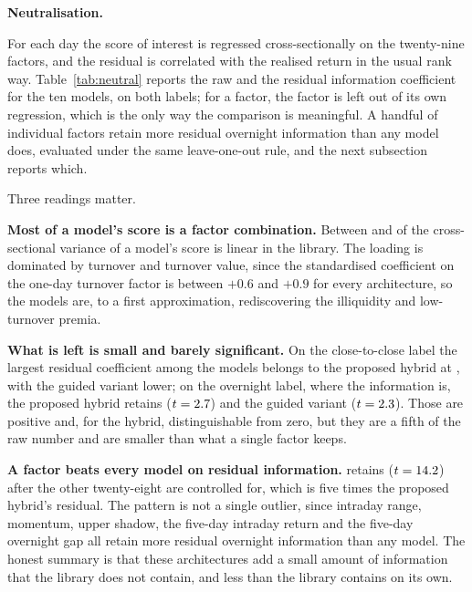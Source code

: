 \documentclass[pdflatex,sn-mathphys-ay]{sn-jnl}
\theoremstyle{thmstyleone}%
\theoremstyle{thmstyletwo}%
\theoremstyle{thmstyletwo}%
\begin{document}
\textbf{Neutralisation.}

For each day the score of interest is regressed cross-sectionally on the twenty-nine factors, and the
residual is correlated with the realised return in the usual rank way. Table~\ref{tab:neutral}
reports the raw and the residual information coefficient for the ten models, on both labels; for a
factor, the factor is left out of its own regression, which is the only way the comparison is
meaningful. A handful of individual factors retain more residual overnight information than any model
does, evaluated under the same leave-one-out rule, and the next subsection reports which.

\begin{table}[!ht]
	\centering
	\caption{Raw and factor-neutralised information coefficients for the ten models. The last column is the share of the cross-sectional variance of a model's score that is linear in the twenty-nine-factor library.}
	\label{tab:neutral}
	
\end{table}

Three readings matter.

\textbf{Most of a model's score is a factor combination.} Between \rSquaredLo{} and \rSquaredHi{} of the
cross-sectional variance of a model's score is linear in the library. The loading is dominated by
turnover and turnover value, since the standardised coefficient on the one-day turnover factor is
between $+0.6$ and $+0.9$ for every architecture, so the models are, to a first approximation, rediscovering
the illiquidity and low-turnover premia.

\textbf{What is left is small and barely significant.} On the close-to-close label the largest
residual coefficient among the models belongs to the proposed hybrid at \residCcBest, with the guided
variant lower; on the overnight label, where the information is, the proposed hybrid retains
\residProp{} ($t = 2.7$) and the guided variant \residGuided{} ($t = 2.3$). Those
are positive and, for the hybrid, distinguishable from zero, but they are a fifth of the raw number
and are smaller than what a single factor keeps.

\textbf{A factor beats every model on residual information.} \bestFactorName{} retains
\bestFactorResid{} ($t = 14.2$) after the other twenty-eight are controlled for, which is five
times the proposed hybrid's residual. The pattern is not a single outlier, since intraday range,
momentum, upper shadow, the five-day intraday return and the five-day overnight gap all retain more
residual overnight information than any model. The honest summary is
that these architectures add a small amount of information that the library does not contain, and less
than the library contains on its own.
\end{document}
